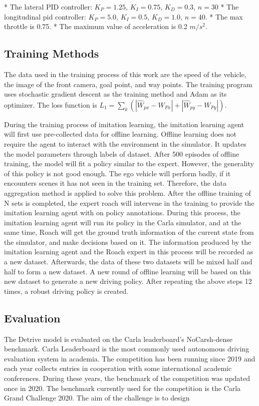 \documentclass[conference]{IEEEtran}
\begin{document}
* The lateral PID controller: \(K_{P}=1.25\), \(K_{I}=0.75\), \(K_{D}=0.3\), \(n=30\)
* The longitudinal pid controller: \(K_{P}=5.0\), \(K_{I}=0.5\), \(K_{D}=1.0\), \(n=40\).
* The max throttle is 0.75.
* The maximum value of acceleration is 0.2 \(m/s^{2}\).

\subsection{Training Methods}

The data used in the training process of this work are the speed of the vehicle, the image of the front camera, goal point, and way points. The training program uses stochastic gradient descent as the training method and Adam as its optimizer. The loss function is \(L_{1}=\sum_{k}(|\hat{W}_{px}-W_{Px}|+|\hat{W}_{py}-W_{Py}|)\).

During the training process of imitation learning, the imitation learning agent will first use pre-collected data for offline learning. Offline learning does not require the agent to interact with the environment in the simulator. It updates the model parameters through labels of dataset. After 500 episodes of offline training, the model will fit a policy similar to the expert. However, the generality of this policy is not good enough. The ego vehicle will perform badly, if it encounters scenes it has not seen in the training set. Therefore, the data aggregation method is applied to solve this problem. After the offline training of N sets is completed, the expert roach will intervene in the training to provide the imitation learning agent with on policy annotations. During this process, the imitation learning agent will run its policy in the Carla simulator, and at the same time, Roach will get the ground truth information of the current state from the simulator, and make decisions based on it. The information produced by the imitation learning agent and the Roach expert in this process will be recorded as a new dataset. Afterwards, the data of these two datasets will be mixed half and half to form a new dataset. A new round of offline learning will be based on this new dataset to generate a new driving policy. After repeating the above steps 12 times, a robust driving policy is created.

\subsection{Evaluation}

The Detrive model is evaluated on the Carla leaderboard's NoCarsh-dense benchmark. Carla Leaderboard is the most commonly used autonomous driving evaluation system in academia. The competition has been running since 2019 and each year collects entries in cooperation with some international academic conferences. During these years, the benchmark of the competition was updated once in 2020. The benchmark currently used for the competition is the Carla Grand Challenge 2020. The aim of the challenge is to design
\end{document}
